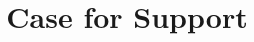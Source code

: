 \documentclass[a4paper,11point]{article}
\title{Case for Support}
\author{}
\begin{document}


\pagebreak



\pagebreak


\end{document}
